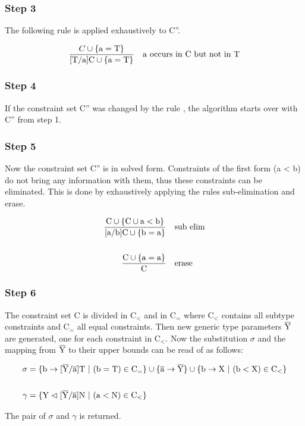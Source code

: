 \subsubsection{Step 3}
The following rule is applied exhaustively to C''.

\begin{align*}
    \frac{C \cup \{ \text{a} = \text{T} \}}{ \text{[T/a]C} \cup \{ \text{a} = \text{T} \} } \quad \text{a occurs in C but not in T}
\end{align*}

\subsubsection{Step 4}
If the constraint set C'' was changed by the rule , the algorithm starts over with C'' from step 1.

\subsubsection{Step 5}
Now the constraint set C'' is in solved form. Constraints of the first form (a < b) do not bring any information with them, thus these constraints can be eliminated.
This is done by exhaustively applying the rules sub-elimination and erase.

\begin{align*}
    \frac{\text{C} \cup \{ \text{C} \cup \text{a} < \text{b} \}}{ \text{[a/b]C} \cup \{ \text{b} = \text{a} \} } \quad &\text{sub elim}
    \\
    \\
    \frac{\text{C} \cup \{ \text{a} = \text{a} \} }{ \text{C} } \quad &\text{erase}
\end{align*}

\subsubsection{Step 6}
The constraint set C is divided in $\text{C}_<$ and in $\text{C}_=$ where $\text{C}_<$ contains all subtype constraints and $\text{C}_=$ all equal constraints.
Then new generic type parameters $\overline{\text{Y}}$ are generated, one for each constraint in $\text{C}_<$. Now the substitution $\sigma$ and the mapping from $\overline{\text{Y}}$ to their upper bounds can be read of as follows:

\begin{align*}
    \sigma &= \{ \text{b} \to \tsxsn{Y}{a}{T} \ | \ (\text{b} = \text{T}) \in \text{C}_= \} \cup \{ \ot{a} \to \ot{Y} \} \cup \{ \text{b} \to \text{X} \ | \ (\text{b} < \text{X}) \in \text{C}_< \}\\
    \\
    \gamma &= \{ \text{Y} \vartriangleleft \tsxsn{Y}{a}{N} \ | \ (\text{a} < \text{N}) \in \text{C}_< \}\\
\end{align*}

The pair of $\sigma$ and $\gamma$ is returned.
